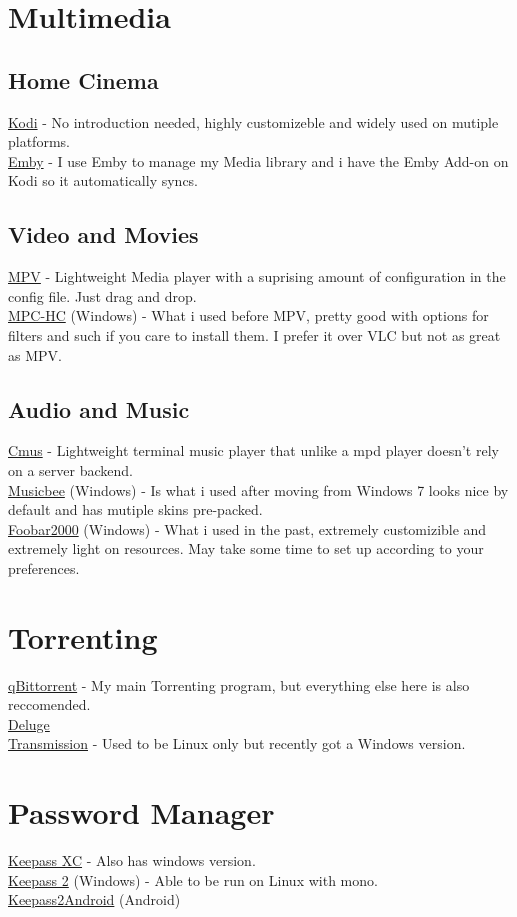\documentclass{article}
\begin{document}
\tableofcontents
\section{Multimedia}
	\subsection{Home Cinema}
		\href{https://kodi.tv/}{Kodi} - No introduction needed, highly customizeble and widely used on mutiple platforms.\\
		\href{https://emby.media/}{Emby} - I use Emby to manage my Media library and i have the Emby Add-on on Kodi so it automatically syncs.
	\subsection{Video and Movies}
		\href{https://mpv.io/}{MPV} - Lightweight Media player with a suprising amount of configuration in the config file. Just drag and drop.\\
		\href{https://mpc-hc.org/}{MPC-HC} (Windows) - What i used before MPV, pretty good with options for filters and such if you care to install them. I prefer it over VLC but not as great as MPV.
	\subsection{Audio and Music}
		\href{https://cmus.github.io/}{Cmus} - Lightweight terminal music player that unlike a mpd player doesn't rely on a server backend.\\
		\href{https://getmusicbee.com/}{Musicbee} (Windows) - Is what i used after moving from Windows 7 looks nice by default and has mutiple skins pre-packed.\\
		\href{https://www.foobar2000.org/}{Foobar2000} (Windows) - What i used in the past, extremely customizible and extremely light on resources. May take some time to set up according to your preferences.
\section{Torrenting}
	\href{https://www.qbittorrent.org/}{qBittorrent} - My main Torrenting program, but everything else here is also reccomended.\\
	\href{https://deluge-torrent.org/}{Deluge}\\
	\href{https://transmissionbt.com/}{Transmission} - Used to be Linux only but recently got a Windows version.
\section{Password Manager}
	\href{https://keepassxc.org/}{Keepass XC} - Also has windows version.\\
	\href{https://keepass.info/}{Keepass 2} (Windows) - Able to be run on Linux with mono.\\
	\href{https://play.google.com/store/apps/details?id=keepass2android.keepass2android}{Keepass2Android} (Android)
\end{document}
